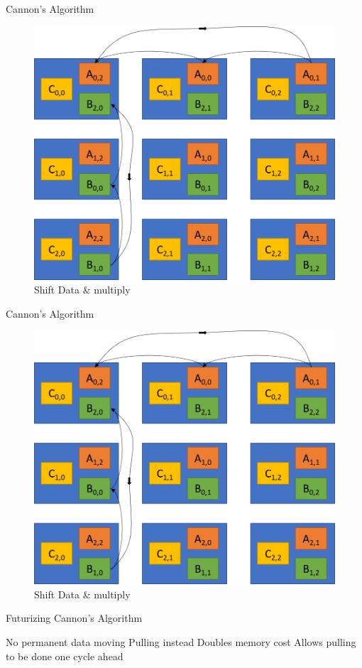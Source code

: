 \documentclass[10pt]{beamer}
\begin{document}
\begin{frame}{Cannon's Algorithm}
\begin{figure}	
	\centering
	\includegraphics[width=0.72\linewidth]{figures/step_3_cannon_2.png}
	\caption{Shift Data \& multiply}
\end{figure}
\end{frame}

\begin{frame}{Cannon's Algorithm}
	\begin{figure}	
		\centering
		\includegraphics[width=0.72\linewidth]{figures/step_3_cannon_2.png}
		\caption{Shift Data \& multiply}
	\end{figure}
\end{frame}

\begin{frame}{Futurizing Cannon's Algorithm}
	\begin{outline}
		\1 No permanent data moving
			\2 Pulling instead
			\2 Doubles memory cost
		\1 Allows pulling to be done one cycle ahead
	\end{outline}
\end{frame}
\end{document}
